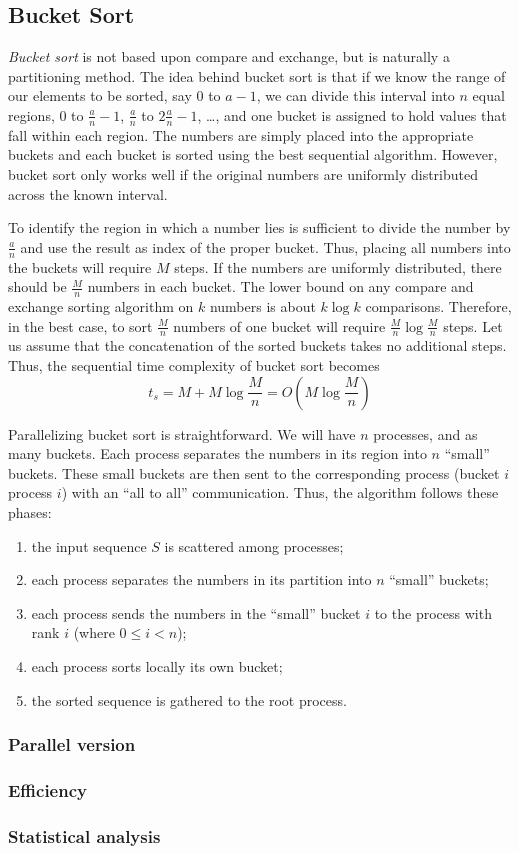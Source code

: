 \subsection{Bucket Sort}
\textit{Bucket sort} is not based upon compare and exchange, but is naturally a partitioning method. The idea behind bucket sort is that if we know the range of our elements to be sorted, say $0$ to $a-1$, we can divide this interval into $n$ equal regions, $0$ to $\frac{a}{n}-1$, $\frac{a}{n}$ to $2\frac{a}{n}-1$, \dots , and one bucket is assigned to hold values that fall within each region. The numbers are simply placed into the appropriate buckets and each bucket is sorted using the best sequential algorithm. However, bucket sort only works well if the original numbers are uniformly distributed across the known interval. 

To identify the region in which a number lies is sufficient to divide the number by $\frac{a}{n}$ and use the result as index of the proper bucket. Thus, placing all numbers into the buckets will require $M$ steps. If the numbers are uniformly distributed, there should be $\frac{M}{n}$ numbers in each bucket. The lower bound on any compare and exchange sorting algorithm on $k$ numbers is about $k \log k$ comparisons. Therefore, in the best case, to sort $\frac{M}{n}$ numbers of one bucket will require $\frac{M}{n} \log \frac{M}{n}$ steps. Let us assume that the concatenation of the sorted buckets takes no additional steps. Thus, the sequential time complexity of bucket sort becomes
\[
t_s = M + M \log \frac{M}{n} = O( M \log \frac{M}{n} )
\]

Parallelizing bucket sort is straightforward. We will have $n$ processes, and as many buckets. Each process separates the numbers in its region into $n$ ``small'' buckets. These small buckets are then sent to the corresponding process (bucket $i$ process $i$) with an ``all to all'' communication. Thus, the algorithm follows these phases:
\begin{enumerate}	
	\item the input sequence $S$ is scattered among processes;
	\item each process separates the numbers in its partition into $n$ ``small'' buckets;
	\item each process sends the numbers in the ``small'' bucket $i$ to the process with rank $i$ (where $0 \leq i < n$);
	\item each process sorts locally its own bucket;
	\item the sorted sequence is gathered to the root process.
\end{enumerate}

 
\subsubsection*{Parallel version} 
\subsubsection*{Efficiency} 
\subsubsection*{Statistical analysis}
